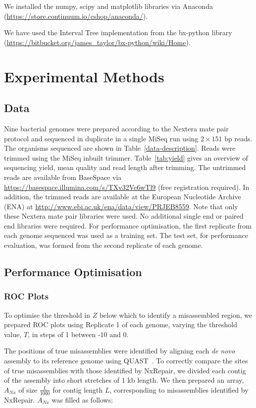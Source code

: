 We installed the numpy, scipy and matplotlib libraries via Anaconda (\url{https://store.continuum.io/cshop/anaconda/}).

We have used the Interval Tree implementation from the bx-python library (\url{https://bitbucket.org/james_taylor/bx-python/wiki/Home}).   

\section{Experimental Methods}
\subsection*{Data}
Nine bacterial genomes were prepared according to the Nextera mate pair protocol and sequenced in duplicate in a single MiSeq run using $2 \times 151$ bp reads. The organisms sequenced are shown in Table~\ref{data-description}. Reads were trimmed using the MiSeq inbuilt trimmer. Table~\ref{tab:yield} gives an overview of sequencing yield, mean quality and read length after trimming. The untrimmed reads are available from BaseSpace via \url{https://basespace.illumina.com/s/TXv32Ve6wTl9} (free registration required). In addition,
the trimmed reads are available at the European Nucleotide Archive (ENA) at \url{http://www.ebi.ac.uk/ena/data/view/PRJEB8559}. Note that only these Nextera mate pair libraries were used. No additional single end or paired end libraries were required. For performance optimisation, the first replicate from each genome sequenced was used as a training set. The test set, for performance evaluation, was formed from the second replicate of each genome. 

\subsection*{Performance Optimisation}
\subsubsection*{ROC Plots}
To optimise the threshold in $Z$ below which to identify a misassembled region, we prepared ROC plots using Replicate 1 of each genome, varying the threshold value, $T$, in steps of 1 between -10 and 0. 

The positions of true misassemblies were identified by aligning each \textit{de novo} assembly to its reference genome using QUAST~\cite{gurevich2013}. To correctly compare the sites of true misassemblies with those identified by NxRepair, we divided each contig of the assembly into short stretches of 1 kb length. We then prepared an array, $A_{Nx}$ of size $\frac{L}{1000}$ for contig length $L$, corresponding to misassemblies identified by NxRepair. $A_{Nx}$ was filled as follows:

